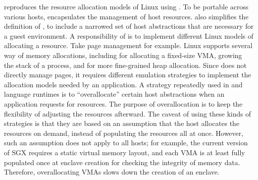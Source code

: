 \thelibos{} reproduces the resource allocation models of Linux
using \thehostabi{}.
To be portable across various hosts,
\thehostabi{} encapsulates the management of host resources.
\graphene{} also simplifies the definition of \thehostabi{},
to include a narrowed set of host abstractions that are necessary
for a guest environment.
A responsibility of \thelibos{}
is to implement different Linux models of allocating a resource.
Take page management for example.
Linux supports several way of memory allocations, including  for allocating a fixed-size VMA, growing the stack of a process, and  for more fine-grained heap allocation.
Since \thelibos{} does not directly manage pages,
it requires different emulation strategies to
implement the allocation models needed by an application. %
A strategy repeatedly used in \thelibos{} and language runtimes
is to ``overallocate'' certain host abstractions when an application requests for resources.
The purpose of overallocation is
to keep the flexibility of adjusting the resources afterward.
The caveat of using these kinds of strategies
is that they are based on an assumption that the host
allocates the resources
on demand, instead of populating the resources all at once.
However, such an assumption does not apply to all hosts;
for example, the current version of SGX requires a static virtual memory layout,
and each VMA is at least fully populated once at enclave creation
for checking the integrity of memory data.
Therefore, overallocating VMAs slows down the creation of an enclave.












